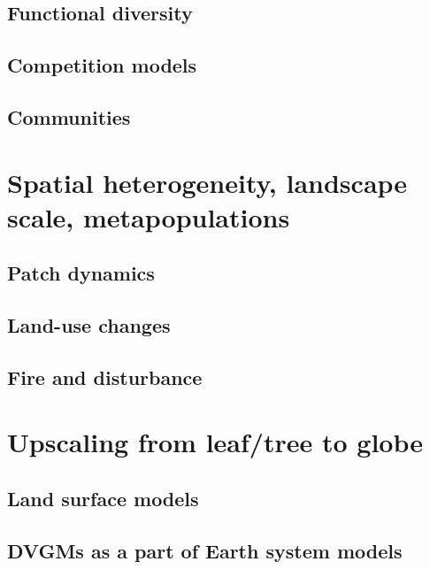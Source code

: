 \documentclass[oneside]{book}
\begin{document}

\section{Functional diversity}\label{functional-diversity}

\section{Competition models}\label{competition-models}

\section{Communities}\label{communities}

\chapter{Spatial heterogeneity, landscape scale,
metapopulations}\label{spatial-heterogeneity-landscape-scale-metapopulations}


\section{Patch dynamics}\label{patch-dynamics}

\section{Land-use changes}\label{land-use-changes}

\section{Fire and disturbance}\label{fire-and-disturbance}

\chapter{Upscaling from leaf/tree to
globe}\label{upscaling-from-leaftree-to-globe}


\section{Land surface models}\label{land-surface-models}

\section{DVGMs as a part of Earth system
models}\label{dvgms-as-a-part-of-earth-system-models}
\end{document}
